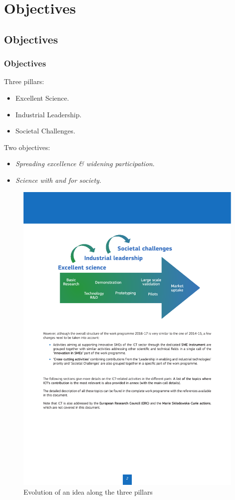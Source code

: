 \documentclass[compress,9pt,xcolor={dvipsnames,table}]{beamer}
\begin{document}
\section{Objectives}
\label{sec:objectives}
\subsection{Objectives}
\begin{frame}\frametitle{Objectives}


\begin{multicols}{2}
Three pillars:
\begin{itemize}
    \item Excellent Science.
    \item Industrial Leadership.
    \item Societal Challenges.
\end{itemize}
Two objectives:
\begin{itemize}
    \item \emph{Spreading excellence \& widening participation}.
    \item \emph{Science with and for society}.
\end{itemize}
\end{multicols}

\begin{figure}
  \centering
  \includegraphics[scale=0.45]{images/pillars-evolution}
  \caption{Evolution of an idea along the three pillars}
  \label{fig:pillars-evolution}
\end{figure}


\end{frame}
\end{document}
